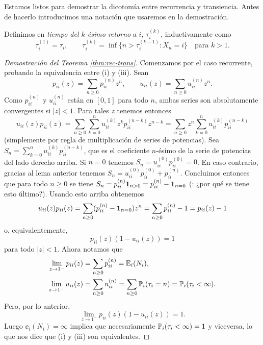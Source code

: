 Estamos listos para demostrar la dicotomía entre recurrencia y transiencia.
Antes de hacerlo introducimos una notación que usaremos en la demostración.

\begin{defn}\label{def:k-retorno}
Definimos en \emph{tiempo del $k$-ésimo retorno} a $i$, $\tau^{(k)}_i$, inductivamente como
\[\tau^{(1)}_i=\tau_i,\qquad\tau^{(k)}_i=\inf\{n>\tau^{(k-1)}_i\!:X_n=i\}\quad\text{para $k>1$}.\]
\end{defn}

\begin{proof}[Demostración del Teorema \ref{thm:rec-trans}]
Comenzamos por el caso recurrente, probando la equivalencia entre (i) y (iii).
Sean
\begin{equation}
p_{ii}(z)=\sum_{n\geq0}p^{(n)}_{ii}z^n,\qquad u_{ii}(z)=\sum_{n\geq0}u^{(n)}_{ii}z^n.
\end{equation}
Como $p^{(n)}_{ii}$ y $u^{(n)}_{ii}$ están en $[0,1]$ para todo $n$, ambas series son absolutamente convergentes si $|z|<1$.
Para tales $z$ tenemos entonces
\[u_{ii}(z)p_{ii}(z)=\sum_{n\geq0}\sum_{k=0}^nu_{ii}^{(k)}z^kp_{ii}^{(n-k)}z^{n-k}=\sum_{n\geq0}z^n\sum_{k=0}^nu_{ii}^{(k)}p_{ii}^{(n-k)}\]
(simplemente por regla de multiplicación de series de potencias).
Sea $S_n=\sum_{k=0}^nu_{ii}^{(k)}p_{ii}^{(n-k)}$, que es el coeficiente $n$-ésimo de la serie de potencias del lado derecho arriba.
Si $n=0$ tenemos $S_n=u_{ii}^{(0)}p_{ii}^{(0)}=0$.
En caso contrario, gracias al lema anterior tenemos $S_n=u_{ii}^{(0)}p_{ii}^{(0)}+p_{ii}^{(n)}$.
Concluimos entonces que para todo $n\geq0$ se tiene $S_n=p_{ii}^{(n)}\mathbf{1}_{n>0}=p_{ii}^{(n)}-\mathbf{1}_{n=0}$ (\uexers: ¿por qué se tiene esto último?).
Usando esto arriba obtenemos
\[u_{ii}(z)p_{ii}(z)=\sum_{n\geq0}(p_{ii}^{(n)}-\mathbf{1}_{n=0})z^n=\sum_{n\geq0}p_{ii}^{(n)}-1=p_{ii}(z)-1\]
o, equivalentemente,
\[p_{ii}(z)(1-u_{ii}(z))=1\]
para todo $|z|<1$.
Ahora notamos que
\begin{align}
\lim_{z\to1^-}p_{ii}(z)&=\sum_{n\geq0}p_{ii}^{(n)}=\mathbb{E}_i(N_i),\\
\lim_{z\to1^-}u_{ii}(z)&=\sum_{n\geq0}u_{ii}^{(n)}=\sum_{n\geq0}\mathbb{P}_i(\tau_i=n)=\mathbb{P}_i(\tau_i<\infty).
\end{align}
Pero, por lo anterior,
\[\lim_{z\to1^-}p_{ii}(z)(1-u_{ii}(z))=1.\]
Luego $\ee_i(N_i)=\infty$ implica que necesariamente $\mathbb{P}_i(\tau_i<\infty)=1$ y viceversa, lo que nos dice que (i) y (iii) son equivalentes.


\end{proof}
